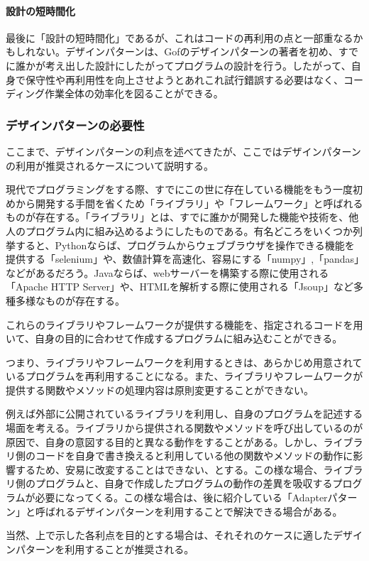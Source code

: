 \documentclass[dvipdfmx]{jsarticle}
\begin{document}
\paragraph{設計の短時間化}最後に「設計の短時間化」であるが、これはコードの再利用の点と一部重なるかもしれない。デザインパターンは、Gofのデザインパターンの著者を初め、すでに誰かが考え出した設計にしたがってプログラムの設計を行う。したがって、自身で保守性や再利用性を向上させようとあれこれ試行錯誤する必要はなく、コーディング作業全体の効率化を図ることができる。
\subsubsection{デザインパターンの必要性}
ここまで、デザインパターンの利点を述べてきたが、ここではデザインパターンの利用が推奨されるケースについて説明する。\par
現代でプログラミングをする際、すでにこの世に存在している機能をもう一度初めから開発する手間を省くため「ライブラリ」や「フレームワーク」と呼ばれるものが存在する。「ライブラリ」とは、すでに誰かが開発した機能や技術を、他人のプログラム内に組み込めるようにしたものである。有名どころをいくつか列挙すると、Pythonならば、プログラムからウェブブラウザを操作できる機能を提供する「selenium」や、数値計算を高速化、容易にする「numpy」,「pandas」などがあるだろう。Javaならば、webサーバーを構築する際に使用される「Apache HTTP Server」や、HTMLを解析する際に使用される「Jsoup」など多種多様なものが存在する。\par
これらのライブラリやフレームワークが提供する機能を、指定されるコードを用いて、自身の目的に合わせて作成するプログラムに組み込むことができる。\par
つまり、ライブラリやフレームワークを利用するときは、あらかじめ用意されているプログラムを再利用することになる。また、ライブラリやフレームワークが提供する関数やメソッドの処理内容は原則変更することができない。\par
例えば外部に公開されているライブラリを利用し、自身のプログラムを記述する場面を考える。ライブラリから提供される関数やメソッドを呼び出しているのが原因で、自身の意図する目的と異なる動作をすることがある。しかし、ライブラリ側のコードを自身で書き換えると利用している他の関数やメソッドの動作に影響するため、安易に改変することはできない、とする。この様な場合、ライブラリ側のプログラムと、自身で作成したプログラムの動作の差異を吸収するプログラムが必要になってくる。この様な場合は、後に紹介している「Adapterパターン」と呼ばれるデザインパターンを利用することで解決できる場合がある。\par
当然、上で示した各利点を目的とする場合は、それそれのケースに適したデザインパターンを利用することが推奨される。
\end{document}
